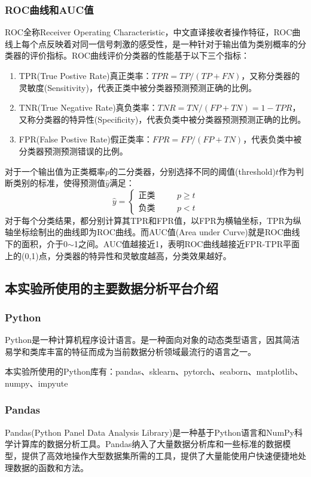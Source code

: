 \documentclass[a4paper]{ctexart}
\begin{document}
\subsubsection{ROC曲线和AUC值}
ROC全称Receiver Operating Characteristic，中文直译接收者操作特征，ROC曲线上每个点反映着对同一信号刺激的感受性，是一种针对于输出值为类别概率的分类器的评价指标。ROC曲线评价分类器的性能基于以下三个指标：
\begin{enumerate}
	\item TPR(True Postive Rate)真正类率：$TPR=TP/(TP+FN)$，又称分类器的灵敏度(Sensitivity)，代表正类中被分类器预测预测正确的比例。
	\item TNR(True Negative Rate)真负类率：$TNR=TN/(FP+TN)=1-TPR$，又称分类器的特异性(Specificity)，代表负类中被分类器预测预测正确的比例。
	\item FPR(False Postive Rate)假正类率：$FPR=FP/(FP+TN)$，代表负类中被分类器预测预测错误的比例。
\end{enumerate}
对于一个输出值为正类概率$p$的二分类器，分别选择不同的阈值(threshold)$t$作为判断类别的标准，使得预测值$\hat y$满足：
\begin{equation}
	\hat y=\left\{
	\begin{split}
		\text{正类}&\quad&p\geq t\\
		\text{负类}&\quad&p<t
	\end{split}
	\right.
\end{equation}
对于每个分类结果，都分别计算其TPR和FPR值，以FPR为横轴坐标，TPR为纵轴坐标绘制出的曲线即为ROC曲线。而AUC值(Area under Curve)就是ROC曲线下的面积，介于0$\sim$1之间。AUC值越接近1，表明ROC曲线越接近FPR-TPR平面上的(0,1)点，分类器的特异性和灵敏度越高，分类效果越好。

\subsection{本实验所使用的主要数据分析平台介绍}
\subsubsection{Python}
Python是一种计算机程序设计语言。是一种面向对象的动态类型语言，因其简洁易学和类库丰富的特征而成为当前数据分析领域最流行的语言之一。

本实验所使用的Python库有：pandas、sklearn、pytorch、seaborn、matplotlib、numpy、impyute

\subsubsection{Pandas}
Pandas(Python Panel Data Analysis Library)是一种基于Python语言和NumPy科学计算库的数据分析工具。Pandas纳入了大量数据分析库和一些标准的数据模型，提供了高效地操作大型数据集所需的工具，提供了大量能使用户快速便捷地处理数据的函数和方法。
\end{document}
